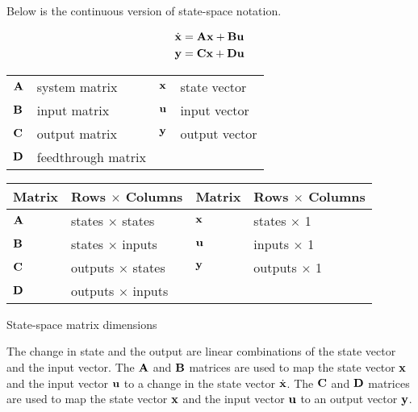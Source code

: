 Below is the continuous version of state-space notation.
\begin{definition}%
  \begin{align}
    \dot{\mathbf{x}} &= \mathbf{A}\mathbf{x} + \mathbf{B}\mathbf{u} \label{eq:cont_ss_x} \\
    \mathbf{y} &= \mathbf{C}\mathbf{x} + \mathbf{D}\mathbf{u} \label{eq:cont_ss_y}
  \end{align}
  \begin{figurekey}
    \begin{tabular}{llll}
      $\mathbf{A}$ & system matrix      & $\mathbf{x}$ & state vector \\
      $\mathbf{B}$ & input matrix       & $\mathbf{u}$ & input vector \\
      $\mathbf{C}$ & output matrix      & $\mathbf{y}$ & output vector \\
      $\mathbf{D}$ & feedthrough matrix &  &  \\
    \end{tabular}
  \end{figurekey}
\end{definition}
\begin{booktable}
  \begin{tabular}{|ll|ll|}
    \hline
    \rowcolor{headingbg}
    \textbf{Matrix} & \textbf{Rows $\times$ Columns} &
    \textbf{Matrix} & \textbf{Rows $\times$ Columns} \\
    \hline
    $\mathbf{A}$ & states $\times$ states & $\mathbf{x}$ & states $\times$ 1 \\
    $\mathbf{B}$ & states $\times$ inputs & $\mathbf{u}$ & inputs $\times$ 1 \\
    $\mathbf{C}$ & outputs $\times$ states & $\mathbf{y}$ & outputs $\times$ 1 \\
    $\mathbf{D}$ & outputs $\times$ inputs &  &  \\
    \hline
  \end{tabular}
  \caption{State-space matrix dimensions}
\end{booktable}

The change in \gls{state} and the \gls{output} are linear combinations of the
\gls{state} vector and the \gls{input} vector. The $\mathbf{A}$ and $\mathbf{B}$
matrices are used to map the \gls{state} vector $\mathbf{x}$ and the \gls{input}
vector $\mathbf{u}$ to a change in the \gls{state} vector $\dot{\mathbf{x}}$. The
$\mathbf{C}$ and $\mathbf{D}$ matrices are used to map the \gls{state} vector
$\mathbf{x}$ and the \gls{input} vector $\mathbf{u}$ to an \gls{output} vector
$\mathbf{y}$.
